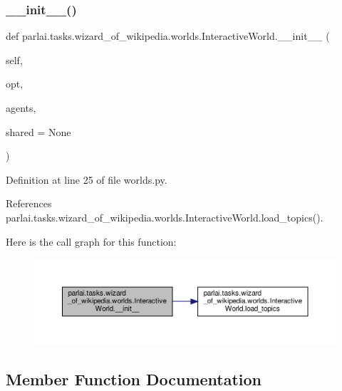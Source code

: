 \subsubsection{\texorpdfstring{\+\_\+\+\_\+init\+\_\+\+\_\+()}{\_\_init\_\_()}}
{\footnotesize\ttfamily def parlai.\+tasks.\+wizard\+\_\+of\+\_\+wikipedia.\+worlds.\+Interactive\+World.\+\_\+\+\_\+init\+\_\+\+\_\+ (\begin{DoxyParamCaption}\item[{}]{self,  }\item[{}]{opt,  }\item[{}]{agents,  }\item[{}]{shared = {\ttfamily None} }\end{DoxyParamCaption})}



Definition at line 25 of file worlds.\+py.



References parlai.\+tasks.\+wizard\+\_\+of\+\_\+wikipedia.\+worlds.\+Interactive\+World.\+load\+\_\+topics().

Here is the call graph for this function\+:
\nopagebreak
\begin{figure}[H]
\begin{center}
\leavevmode
\includegraphics[width=350pt]{classparlai_1_1tasks_1_1wizard__of__wikipedia_1_1worlds_1_1InteractiveWorld_a17330f1fd256bd53eafea1c7e119d77d_cgraph}
\end{center}
\end{figure}


\subsection{Member Function Documentation}
\mbox{\label{classparlai_1_1tasks_1_1wizard__of__wikipedia_1_1worlds_1_1InteractiveWorld_a01cde3e1317b31cf52024283f061fdf6}} 

